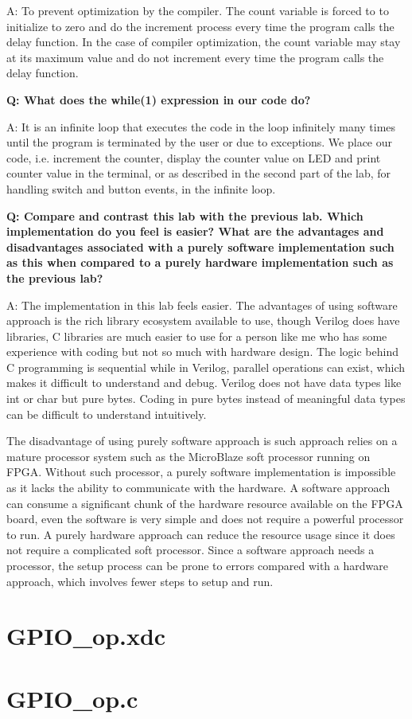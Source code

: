 \documentclass[11pt,letterpaper,titlepage]{article}
\begin{document}
A: To prevent optimization by the compiler. The count variable is forced to to initialize to zero and do the increment process every time the program calls the delay function. In the case of compiler optimization, the count variable may stay at its maximum value and do not increment every time the program calls the delay function.

\textbf{Q: What does the while(1) expression in our code do?}

A: It is an infinite loop that executes the code in the loop infinitely many times until the program is terminated by the user or due to exceptions. We place our code, i.e. increment the counter, display the counter value on LED and print counter value in the terminal, or as described in the second part of the lab, for handling switch and button events, in the infinite loop.

\textbf{Q: Compare and contrast this lab with the previous lab. Which implementation do you feel is easier? What are the advantages and disadvantages associated with a purely software implementation such as this when compared to a purely hardware implementation such as the previous lab?}

A: The implementation in this lab feels easier. The advantages of using software approach is the rich library ecosystem available to use, though Verilog does have libraries, C libraries are much easier to use for a person like me who has some experience with coding but not so much with hardware design. The logic behind C programming is sequential while in Verilog, parallel operations can exist, which makes it difficult to understand and debug. Verilog does not have data types like int or char but pure bytes. Coding in pure bytes instead of meaningful data types can be difficult to understand intuitively.

The disadvantage of using purely software approach is such approach relies on a mature processor system such as the MicroBlaze soft processor running on FPGA. Without such processor, a purely software implementation is impossible as it lacks the ability to communicate with the hardware. A software approach can consume a significant chunk of the hardware resource available on the FPGA board, even the software is very simple and does not require a powerful processor to run. A purely hardware approach can reduce the resource usage since it does not require a complicated soft processor. Since a software approach needs a processor, the setup process can be prone to errors compared with a hardware approach, which involves fewer steps to setup and run.

\newpage

\begin{appendices}

\section{GPIO\_op.xdc}
\label{appendix:GPIO_xdc}


\section{GPIO\_op.c}
\label{appendix:GPIO_c}


\end{appendices}
\end{document}
